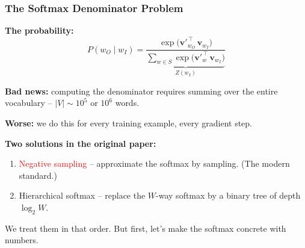 \documentclass[notes,11pt, aspectratio=169]{beamer}
\newcommand{\vv}{\mathbf{v}}
\begin{document}
\begin{frame}
\frametitle{The Softmax Denominator Problem}

\textbf{The probability:}
\[
    P(w_O \mid w_I) = \frac{\exp\!\bigl(\vv'^{\,\top}_{w_O}\, \vv_{w_I}\bigr)}
                           {\underbrace{\sum_{w \in S} \exp\!\bigl(\vv'^{\,\top}_{w}\, \vv_{w_I}\bigr)}_{Z(w_I)}}
\]

\vspace{6pt}
\textbf{Bad news:} computing the denominator requires summing over the entire vocabulary -- $|V| \sim 10^5$ or $10^6$ words.

\vspace{4pt}
\textbf{Worse:} we do this for every training example, every gradient step.

\vspace{8pt}
\textbf{Two solutions in the original paper:}
\begin{enumerate}
    \item \textcolor{red}{Negative sampling} -- approximate the softmax by sampling. (The modern standard.)
    \item Hierarchical softmax -- replace the $W$-way softmax by a binary tree of depth $\log_2 W$.
\end{enumerate}

\vspace{4pt}
We treat them in that order. But first, let's make the softmax concrete with numbers.
\end{frame}
\end{document}
